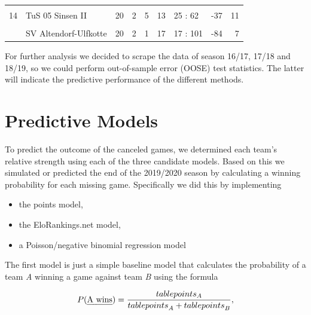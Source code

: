 \documentclass[12pt,a4paper]{article}
\begin{document}
\begin{table}[H]
{\begin{tabular}[t]{rllrrrlrr}
\cellcolor{gray!6}{13} & \cellcolor{gray!6}{SC Reken II} & \cellcolor{gray!6}{19} & \cellcolor{gray!6}{4} & \cellcolor{gray!6}{3} & \cellcolor{gray!6}{12} & \cellcolor{gray!6}{41 : 61} & \cellcolor{gray!6}{-20} & \cellcolor{gray!6}{15}\\
14 & TuS 05 Sinsen II & 20 & 2 & 5 & 13 & 25 : 62 & -37 & 11\\
\cellcolor{gray!6}{15} & \cellcolor{gray!6}{Adler Weseke II} & \cellcolor{gray!6}{20} & \cellcolor{gray!6}{2} & \cellcolor{gray!6}{4} & \cellcolor{gray!6}{14} & \cellcolor{gray!6}{23 : 64} & \cellcolor{gray!6}{-41} & \cellcolor{gray!6}{10}\\
\addlinespace
16 & SV Altendorf-Ulfkotte & 20 & 2 & 1 & 17 & 17 : 101 & -84 & 7\\
\bottomrule
\end{tabular}}
\end{table}

For further analysis we decided to scrape the data of season 16/17,
17/18 and 18/19, so we could perform out-of-sample error (OOSE) test
statistics. The latter will indicate the predictive performance of the
different methods.

\hypertarget{predictive-models}{%
\section{Predictive Models}\label{predictive-models}}

To predict the outcome of the canceled games, we determined each team's
relative strength using each of the three candidate models. Based on
this we simulated or predicted the end of the 2019/2020 season by
calculating a winning probability for each missing game. Specifically we
did this by implementing

\begin{itemize}
\item the points model,
\item the EloRankings.net model, 
\item a Poisson/negative binomial regression model
\end{itemize}

The first model is just a simple baseline model that calculates the
probability of a team \emph{A} winning a game against team \emph{B}
using the formula

\begin{align}
P(\text{\emph{A wins}}) = \frac{table points_A}{{table points}_A + {table points}_B},
\end{align}
\end{document}
